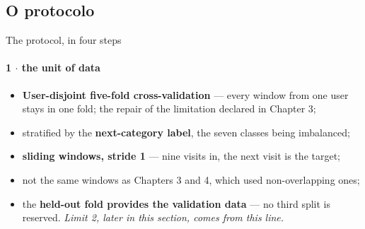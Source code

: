 \documentclass{beamer}
\begin{document}
\subsection{O protocolo}

\begin{frame}{The protocol, in four steps}
    \framesubtitle{1 $\cdot$ the unit of data}

    \begin{itemize}\setlength{\itemsep}{4pt}
        \item \textbf{User-disjoint five-fold cross-validation} --- every window from one user
              stays in one fold; \alert{the repair of the limitation declared in Chapter 3};
        \item stratified by the \textbf{next-category label}, the seven classes being imbalanced;
        \item \textbf{sliding windows, stride 1} --- nine visits in, the next visit is the target;
        \item \alert{not the same windows as Chapters 3 and 4}, which used non-overlapping ones;
        \item the \textbf{held-out fold provides the validation data} --- no third split is
              reserved. \emph{Limit 2, later in this section, comes from this line.}
    \end{itemize}
\end{frame}
\end{document}
